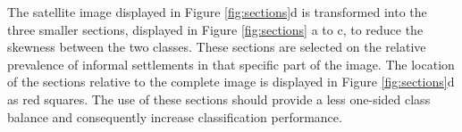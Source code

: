 The satellite image displayed in Figure \ref{fig:sections}d is transformed into the three smaller sections, displayed in Figure \ref{fig:sections} a to c, to reduce the skewness between the two classes. These sections are selected on the relative prevalence of informal settlements in that specific part of the image. The location of the sections relative to the complete image is displayed in Figure \ref{fig:sections}d as red squares. The use of these sections should provide a less one-sided class balance and consequently increase classification performance. 


